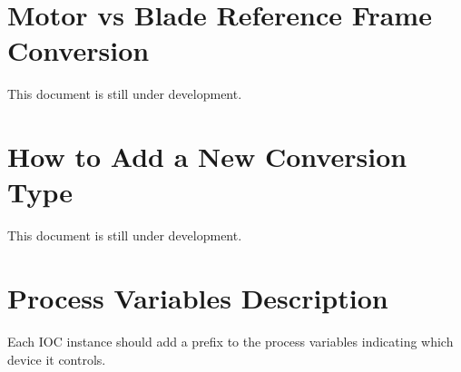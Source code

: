 \documentclass[openany]{article}
\begin{document}
\section{Motor vs Blade Reference Frame Conversion}\label{sec:ref-frame-conv}

    This document is still under development.

\section{How to Add a New Conversion Type}

    This document is still under development.

\newpage
\section{Process Variables Description}\label{sec:process-variables}

    Each IOC instance should add a prefix to the process variables indicating which device it controls.
\end{document}

